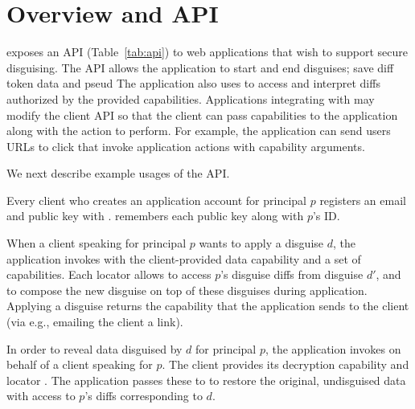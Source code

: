 \section{Overview and API}
\label{s:api}


\sys exposes an API (Table~\ref{tab:api}) to web applications that wish to support secure
disguising.
%
The API allows the application to start and end disguises; save diff token data 
and pseud
The application also uses \sys to access and interpret diffs authorized by the provided
capabilities.  Applications integrating with \sys may modify the client API
so that the client can pass capabilities to the application along with the action to perform.
For example, the application can send users URLs to click that invoke application actions with
capability arguments.


We next describe example usages of the API.

Every client who creates an application account for principal $p$ registers an email and public key with \sys.
\sys remembers each public key  along with $p$'s ID.

When a client speaking for principal $p$ wants to apply a disguise $d$,
the application invokes  with the client-provided data
capability and a set of  capabilities. Each locator  allows \sys to
access $p$'s disguise diffs from disguise $d'$, and to compose the new disguise on top of these
disguises during application. Applying a disguise returns the  capability  that
the application sends to the client (via e.g., emailing the client a link).

In order to reveal data disguised by $d$ for principal $p$, the application invokes
 on behalf of a client speaking for $p$. The client provides its decryption capability
 and locator . The application passes these to \sys to restore the
original, undisguised data with access to $p$'s diffs corresponding to $d$.

